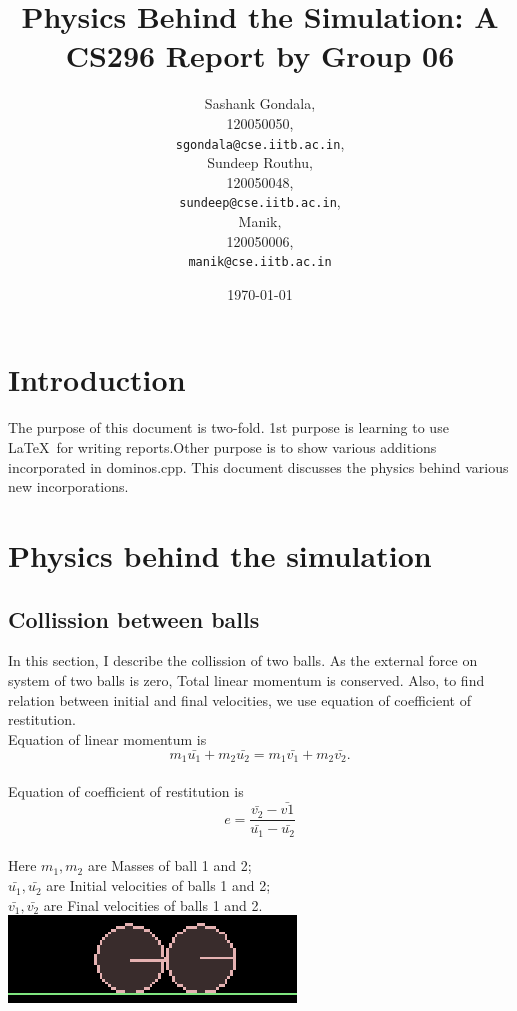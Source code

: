 \documentclass[11pt]{article}
\begin{document}
\title{Physics Behind the Simulation: A CS296 Report by Group 06}
\author{Sashank Gondala,\\
	120050050,\\
	\texttt{sgondala@cse.iitb.ac.in},\\
	Sundeep Routhu,\\
	120050048,\\
	\texttt{sundeep@cse.iitb.ac.in},\\
	Manik,\\
	120050006,\\
	\texttt{manik@cse.iitb.ac.in}}
\date{\today}
\maketitle
\pagebreak
\section{Introduction}
The purpose of this document is two-fold. 1st purpose is learning to use \LaTeX\ for writing reports.Other purpose is to show various additions incorporated in dominos.cpp. This document discusses the physics behind various new incorporations.  
\section{Physics behind the simulation}
\subsection{Collission between balls}
In this section, I describe the collission of two balls. As the external force on system of two balls is zero, Total linear momentum is conserved. Also, to find relation between initial and final velocities, we use equation of coefficient of restitution.\\
Equation of linear momentum is 
\begin{equation} m_{1}\bar{u_{1}}+m_{2}\bar{u_{2}}=m_{1}\bar{v_{1}}+m_{2}\bar{v_{2}}.\end{equation}\\
Equation of coefficient of restitution is\cite{irodov80}
\begin{equation}e=\frac{\bar{v_{2}}-\bar{v{1}}}{\bar{u_{1}}-\bar{u_{2}}}\end{equation}\\
Here $m_{1},m_{2}$ are Masses of ball 1 and 2;\\ $\bar{u_{1}},\bar{u_{2}}$ are Initial velocities of balls 1 and 2;\\
$\bar{v_{1}},\bar{v_{2}}$ are Final velocities of balls 1 and 2.\\
\includegraphics{2}
\end{document}
